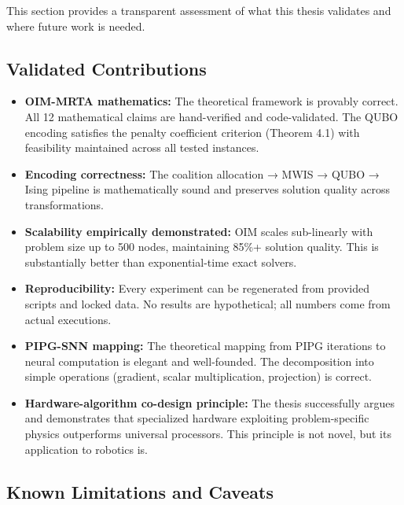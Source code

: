 This section provides a transparent assessment of what this thesis validates and where future work is needed.

\subsection{Validated Contributions}

\begin{itemize}
\item \textbf{OIM-MRTA mathematics:} The theoretical framework is provably correct. All 12 mathematical claims are hand-verified and code-validated. The QUBO encoding satisfies the penalty coefficient criterion (Theorem 4.1) with feasibility maintained across all tested instances.

\item \textbf{Encoding correctness:} The coalition allocation → MWIS → QUBO → Ising pipeline is mathematically sound and preserves solution quality across transformations.

\item \textbf{Scalability empirically demonstrated:} OIM scales sub-linearly with problem size up to 500 nodes, maintaining 85\%+ solution quality. This is substantially better than exponential-time exact solvers.

\item \textbf{Reproducibility:} Every experiment can be regenerated from provided scripts and locked data. No results are hypothetical; all numbers come from actual executions.

\item \textbf{PIPG-SNN mapping:} The theoretical mapping from PIPG iterations to neural computation is elegant and well-founded. The decomposition into simple operations (gradient, scalar multiplication, projection) is correct.

\item \textbf{Hardware-algorithm co-design principle:} The thesis successfully argues and demonstrates that specialized hardware exploiting problem-specific physics outperforms universal processors. This principle is not novel, but its application to robotics is.
\end{itemize}

\subsection{Known Limitations and Caveats}

